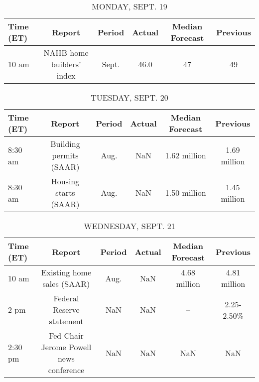 \documentclass{article}%
\begin{document}
%
\normalsize%


\begin{table}[htbp]%
\caption{MONDAY, SEPT. 19}%
\centering%
\begin{adjustbox}{width=1\textwidth}%
\begin{tabular}{lccccc}
\toprule
Time (ET) &                    Report & Period & Actual & Median Forecast & Previous \\
\midrule
    10 am & NAHB home builders' index &  Sept. &   46.0 &              47 &       49 \\
\bottomrule
\end{tabular}
%
\end{adjustbox}%
\end{table}

%


\begin{table}[htbp]%
\caption{TUESDAY, SEPT. 20}%
\centering%
\begin{adjustbox}{width=1\textwidth}%
\begin{tabular}{lccccc}
\toprule
Time (ET) &                  Report & Period & Actual & Median Forecast &     Previous \\
\midrule
  8:30 am & Building permits (SAAR) &   Aug. &    NaN &    1.62 million & 1.69 million \\
  8:30 am &   Housing starts (SAAR) &   Aug. &    NaN &    1.50 million & 1.45 million \\
\bottomrule
\end{tabular}
%
\end{adjustbox}%
\end{table}

%


\begin{table}[htbp]%
\caption{WEDNESDAY, SEPT. 21}%
\centering%
\begin{adjustbox}{width=1\textwidth}%
\begin{tabular}{lccccc}
\toprule
Time (ET) &                                  Report & Period & Actual & Median Forecast &     Previous \\
\midrule
    10 am &              Existing home sales (SAAR) &   Aug. &    NaN &    4.68 million & 4.81 million \\
     2 pm &               Federal Reserve statement &    NaN &    NaN &              -- &   2.25-2.50\% \\
  2:30 pm & Fed Chair Jerome Powell news conference &    NaN &    NaN &             NaN &          NaN \\
\bottomrule
\end{tabular}
%
\end{adjustbox}%
\end{table}
\end{document}
